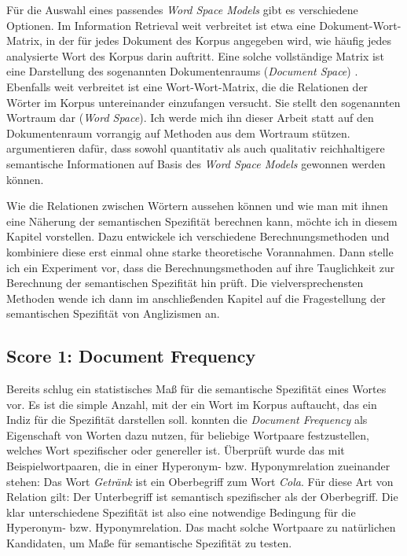 \documentclass[11pt,numbers=noenddot]{scrartcl}
\begin{document}
Für die Auswahl eines passendes \emph{Word Space Models} gibt es verschiedene Optionen. Im Information Retrieval weit verbreitet ist etwa eine Dokument-Wort-Matrix, in der für jedes Dokument des Korpus angegeben wird, wie häufig jedes analysierte Wort des Korpus darin auftritt. Eine solche vollständige Matrix ist eine Darstellung des sogenannten Dokumentenraums (\emph{Document Space}) \citep[S.296]{manning1999}. Ebenfalls weit verbreitet ist eine Wort-Wort-Matrix, die die Relationen der Wörter im Korpus untereinander einzufangen versucht. Sie stellt den sogenannten Wortraum dar (\emph{Word Space}). Ich werde mich ihn dieser Arbeit statt auf den Dokumentenraum vorrangig auf Methoden aus dem Wortraum stützen. \citet{Schutze:1994:CTT:2856823.2856847} argumentieren dafür, dass sowohl quantitativ als auch qualitativ reichhaltigere semantische Informationen auf Basis des \emph{Word Space Models} gewonnen werden können.

Wie die Relationen zwischen Wörtern aussehen können und wie man mit ihnen eine Näherung der semantischen Spezifität berechnen kann, möchte ich in diesem Kapitel vorstellen. Dazu entwickele ich verschiedene Berechnungsmethoden und kombiniere diese erst einmal ohne starke theoretische Vorannahmen. Dann stelle ich ein Experiment vor, dass die Berechnungsmethoden auf ihre Tauglichkeit zur Berechnung der semantischen Spezifität hin prüft. Die vielversprechensten Methoden wende ich dann im anschließenden Kapitel auf die Fragestellung der semantischen Spezifität von Anglizismen an.

\subsection{Score 1: Document Frequency} \label{df}
Bereits \citet{sparckjones1972} schlug ein statistisches Maß für die semantische Spezifität eines Wortes vor. Es ist die simple Anzahl, mit der ein Wort im Korpus auftaucht, das ein Indiz für die Spezifität darstellen soll. \citet{Caraballo99determiningthe} konnten die \emph{Document Frequency} als Eigenschaft von Worten dazu nutzen, für beliebige Wortpaare festzustellen, welches Wort  spezifischer oder genereller ist. Überprüft wurde das mit Beispielwortpaaren, die in einer Hyperonym- bzw. Hyponymrelation zueinander stehen: Das Wort \emph{Getränk} ist ein Oberbegriff zum Wort \emph{Cola}. Für diese Art von Relation gilt: Der Unterbegriff ist semantisch spezifischer als der Oberbegriff. Die klar unterschiedene Spezifität ist also eine notwendige Bedingung für die Hyperonym- bzw. Hyponymrelation. Das macht solche Wortpaare zu natürlichen Kandidaten, um Maße für semantische Spezifität zu testen.
\end{document}
